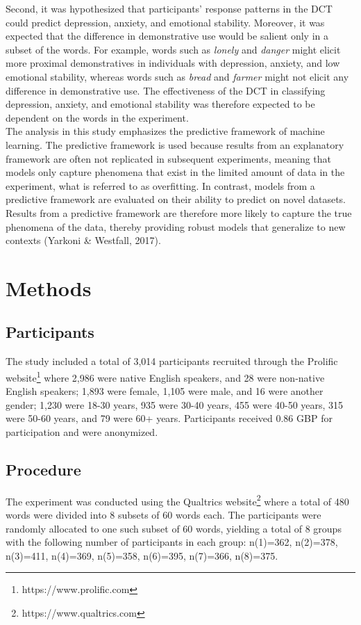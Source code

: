 \documentclass[11pt, a4paper]{article}
\begin{document}
Second, it was hypothesized that participants’ response patterns in the DCT could predict depression, anxiety, and emotional stability. Moreover, it was expected that the difference in demonstrative use would be salient only in a subset of the words. For example, words such as \textit{lonely} and \textit{danger} might elicit more proximal demonstratives in individuals with depression, anxiety, and low emotional stability, whereas words such as \textit{bread} and \textit{farmer} might not elicit any difference in demonstrative use. The effectiveness of the DCT in classifying depression, anxiety, and emotional stability was therefore expected to be dependent on the words in the experiment. \\

The analysis in this study emphasizes the predictive framework of machine learning. The predictive framework is used because results from an explanatory framework are often not replicated in subsequent experiments, meaning that models only capture phenomena that exist in the limited amount of data in the experiment, what is referred to as overfitting. In contrast, models from a predictive framework are evaluated on their ability to predict on novel datasets. Results from a predictive framework are therefore more likely to capture the true phenomena of the data, thereby providing robust models that generalize to new contexts (Yarkoni \& Westfall, 2017).


\section{Methods}

\subsection{Participants}
The study included a total of 3,014 participants recruited through the Prolific website\footnote{https://www.prolific.com} where 2,986 were native English speakers, and 28 were non-native English speakers; 1,893 were female, 1,105 were male, and 16 were another gender; 1,230 were 18-30 years, 935 were 30-40 years, 455 were 40-50 years, 315 were 50-60 years, and 79 were 60+ years. Participants received 0.86 GBP for participation and were anonymized. 


\subsection{Procedure}
The experiment was conducted using the Qualtrics website\footnote{https://www.qualtrics.com} where a total of 480 words were divided into 8 subsets of 60 words each. The participants were randomly allocated to one such subset of 60 words, yielding a total of 8 groups with the following number of participants in each group: n(1)=362, n(2)=378, n(3)=411, n(4)=369, n(5)=358, n(6)=395, n(7)=366, n(8)=375. \\
\end{document}
